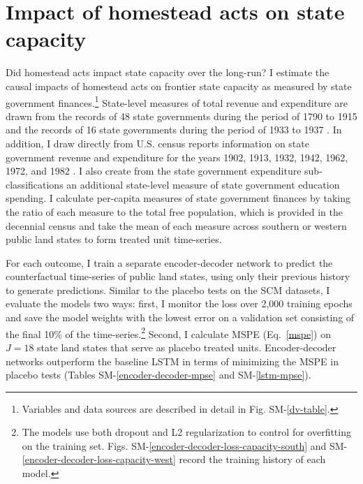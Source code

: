 \documentclass[12pt]{article}
\begin{document}
\section{Impact of homestead acts on state capacity} \label{state-capacity}




Did homestead acts impact state capacity over the long-run? I estimate the causal impacts of homestead acts on frontier state capacity as measured by state government finances.\footnote{Variables and data sources are described in detail in Fig. SM-\ref{dv-table}.} State-level measures of total revenue and expenditure are drawn from the records of 48 state governments during the period of 1790 to 1915 and the records of 16 state governments during the period of 1933 to 1937 \citep{sylla1993sources,sylla1995sourcesa,sylla1995sourcesb}. In addition, I draw directly from U.S. census reports information on state government revenue and expenditure for the years 1902, 1913, 1932, 1942, 1962, 1972, and 1982  \citep{haines2010}. I also create from the state government expenditure sub-classifications an additional state-level measure of state government education spending. I calculate per-capita measures of state government finances by taking the ratio of each measure to the total free population, which is provided in the decennial census \citep{haines2010} and take the mean of each measure  across southern or western public land states to form treated unit time-series.

For each outcome, I train a separate encoder-decoder network to predict the counterfactual time-series of public land states, using only their previous history to generate predictions. Similar to the placebo tests on the SCM datasets, I evaluate the models two ways: first, I monitor the loss over 2,000 training epochs and save the model weights with the lowest error on a validation set consisting of the final 10\% of the time-series.\footnote{The models use both dropout and L2 regularization to control for overfitting on the training set. Figs. SM-\ref{encoder-decoder-loss-capacity-south} and SM-\ref{encoder-decoder-loss-capacity-west} record the training history of each model.} Second, I calculate MSPE (Eq.~\ref{mspe}) on $J=18$ state land states that serve as placebo treated units. Encoder-decoder networks outperform the baseline LSTM in terms of minimizing the MSPE in placebo tests (Tables SM-\ref{encoder-decoder-mpse} and SM-\ref{lstm-mpse}).
\end{document}
